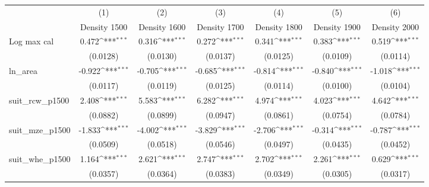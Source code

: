 {
\def\sym#1{\ifmmode^{#1}\else\(^{#1}\)\fi}
\begin{tabular}{l*{6}{c}}
\toprule
                    &\multicolumn{1}{c}{(1)}&\multicolumn{1}{c}{(2)}&\multicolumn{1}{c}{(3)}&\multicolumn{1}{c}{(4)}&\multicolumn{1}{c}{(5)}&\multicolumn{1}{c}{(6)}\\
                    &\multicolumn{1}{c}{Density 1500}&\multicolumn{1}{c}{Density 1600}&\multicolumn{1}{c}{Density 1700}&\multicolumn{1}{c}{Density 1800}&\multicolumn{1}{c}{Density 1900}&\multicolumn{1}{c}{Density 2000}\\
\midrule
Log max cal         &       0.472\sym{***}&       0.316\sym{***}&       0.272\sym{***}&       0.341\sym{***}&       0.383\sym{***}&       0.519\sym{***}\\
                    &    (0.0128)         &    (0.0130)         &    (0.0137)         &    (0.0125)         &    (0.0109)         &    (0.0114)         \\
\addlinespace
ln\_area             &      -0.922\sym{***}&      -0.705\sym{***}&      -0.685\sym{***}&      -0.814\sym{***}&      -0.840\sym{***}&      -1.018\sym{***}\\
                    &    (0.0117)         &    (0.0119)         &    (0.0125)         &    (0.0114)         &    (0.0100)         &    (0.0104)         \\
\addlinespace
suit\_rcw\_p1500      &       2.408\sym{***}&       5.583\sym{***}&       6.282\sym{***}&       4.974\sym{***}&       4.023\sym{***}&       4.642\sym{***}\\
                    &    (0.0882)         &    (0.0899)         &    (0.0947)         &    (0.0861)         &    (0.0754)         &    (0.0784)         \\
\addlinespace
suit\_mze\_p1500      &      -1.833\sym{***}&      -4.002\sym{***}&      -3.829\sym{***}&      -2.706\sym{***}&      -0.314\sym{***}&      -0.787\sym{***}\\
                    &    (0.0509)         &    (0.0518)         &    (0.0546)         &    (0.0497)         &    (0.0435)         &    (0.0452)         \\
\addlinespace
suit\_whe\_p1500      &       1.164\sym{***}&       2.621\sym{***}&       2.747\sym{***}&       2.702\sym{***}&       2.261\sym{***}&       0.629\sym{***}\\
                    &    (0.0357)         &    (0.0364)         &    (0.0383)         &    (0.0349)         &    (0.0305)         &    (0.0317)         \\

\end{tabular}}
